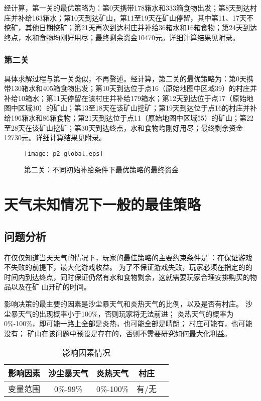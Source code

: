\documentclass[withoutpreface,bwprint]{cumcmthesis} %
\begin{document}
经计算，第一关的最优策略为：第0天携带178箱水和333箱食物出发；第8天到达村庄并补给163箱水；第10天到达矿山，第11至19天在矿山停留，其中第11、17天不挖矿，其他日期挖矿；第21天再次到达村庄并补给36箱水和16箱食物；第24天到达终点，水和食物均刚好用尽；最终剩余资金10470元。详细计算结果见附录。
\subsubsection{第二关}
具体求解过程与第一关类似，不再赘述。经计算，第二关的最优策略为：第0天携带130箱水和405箱食物出发；第10天到达位于点16（原始地图中区域39）的村庄并补给10箱水；第11天停留在该村庄并补给179箱水；第12天到达位于点17（原始地图中区域30）的矿山；第13至18天在该矿山挖矿；第19天到达位于点16的村庄并补给196箱水和86箱食物；第21天到达位于点11（原始地图中区域55）的矿山；第22至28天在该矿山挖矿；第30天到达终点，水和食物均刚好用尽；最终剩余资金12730元。详细计算结果见附录。

\begin{figure}
    \centering
    \texttt{[image: p2\_global.eps]}
    \caption{第二关：不同初始补给条件下最优策略的最终资金}
    \label{p2_global}
\end{figure}

\section{天气未知情况下一般的最佳策略}
\label{sec:simulate}

\subsection{问题分析}

在仅仅知道当天天气的情况下，玩家的最佳策略的主要约束条件是 ：在保证游戏不失败的前提下，最大化游戏收益。
为了不保证游戏失败，玩家必须在指定的的时间内到达终点，同时保证仍然有水和食物剩余，这就需要玩家合理安排购买的物品以及在矿
山开矿的时间。

影响决策的最主要的因素是沙尘暴天气和炎热天气的比例，以及是否有村庄。
沙尘暴天气的出现概率小于100\%，否则玩家将无法前进；
炎热天气的概率为0\%-100\%，即可能一路上全部是炎热，也可能全部是晴朗；
村庄可能有，也可能没有；
矿山在该问题中预设是存在的，否则不需要研究如何最大化利益。


\begin{table}[!htbp]
    \caption{影响因素情况}\label{tab:001} \centering
    \begin{tabular}{c|cccc}
        \toprule[1.5pt]
        影响因素 & 沙尘暴天气 & 炎热天气 & 村庄 \\
        \midrule[1pt]
        变量范围 & 0\%-99\% & 0\%-100\% & 有/无 \\
        \bottomrule[1.5pt]
    \end{tabular}
\end{table}
\end{document}
